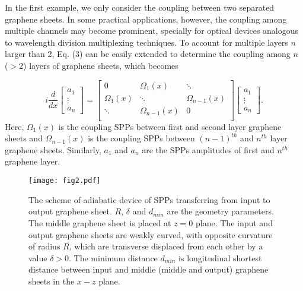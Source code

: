 \documentclass[preprint,12pt,numbers,sort&compress]{elsarticle}
\begin{document}
In the first example, we only consider the coupling between two separated graphene sheets.
In some practical applications, however, the coupling among multiple channels may become prominent, specially for optical devices analogous to wavelength division multiplexing techniques.
To account for multiple layers $n$ larger than 2, Eq. (3) can be easily extended to determine the coupling among $n$ ($>$2) layers of graphene sheets, which becomes

\begin{equation}
i\dfrac{d}{d x}
\begin{bmatrix}
a_{1} \\
\vdots \\
a_{n}
\end{bmatrix}
= \begin{bmatrix}
0 & \Omega_1(x) & \ddots \\
\Omega_1(x) & \ddots & \Omega_{n-1}(x) \\
\ddots & \Omega_{n-1}(x) & 0 \\
\end{bmatrix} \begin{bmatrix}
a_{1} \\
\vdots \\
a_{n}
\end{bmatrix}.
\end{equation}
Here, $\Omega_1(x)$ is the coupling SPPs between first and second layer graphene sheets and $\Omega_{n-1}(x)$ is the coupling SPPs between $(n-1)^{th}$ and $n^{th}$ layer graphene sheets. Similarly, $a_1$ and $a_n$ are the SPPs amplitudes of first and $n^{th}$ graphene layer.

\begin{figure}[hbtp]
\centering
\texttt{[image: fig2.pdf]}
\caption{The scheme of adiabatic device of SPPs transferring from input to output graphene sheet. $R$, $\delta$ and $d_{min}$ are the geometry parameters. The middle graphene sheet is placed at $z=0$ plane. The input and output graphene sheets are weakly curved, with opposite curvature of radius $R$, which are transverse displaced from each other by a value $\delta > 0$. The minimum distance $d_{min}$ is longitudinal shortest distance between input and middle (middle and output) graphene sheets in the $x-z$ plane.}
\end{figure}
\end{document}
